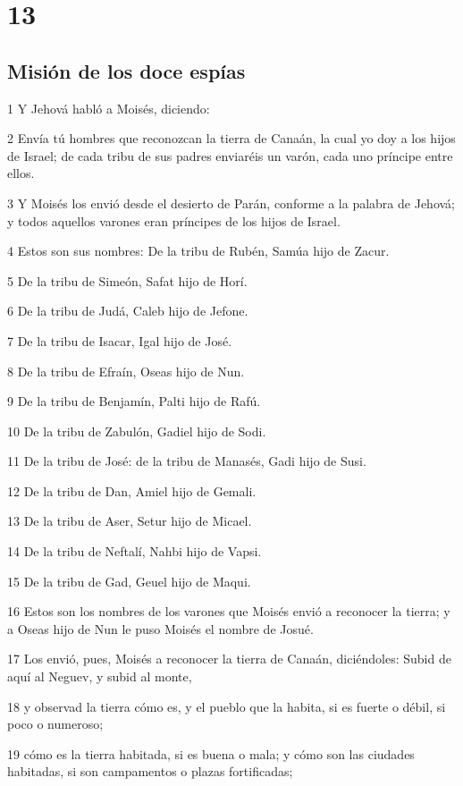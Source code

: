 \chapter{13}

\section*{Misión de los doce espías }

\par 1 Y Jehová habló a Moisés, diciendo:
\par 2 Envía tú hombres que reconozcan la tierra de Canaán, la cual yo doy a los hijos de Israel; de cada tribu de sus padres enviaréis un varón, cada uno príncipe entre ellos.
\par 3 Y Moisés los envió desde el desierto de Parán, conforme a la palabra de Jehová; y todos aquellos varones eran príncipes de los hijos de Israel.
\par 4 Estos son sus nombres: De la tribu de Rubén, Samúa hijo de Zacur.
\par 5 De la tribu de Simeón, Safat hijo de Horí.
\par 6 De la tribu de Judá, Caleb hijo de Jefone.
\par 7 De la tribu de Isacar, Igal hijo de José.
\par 8 De la tribu de Efraín, Oseas hijo de Nun.
\par 9 De la tribu de Benjamín, Palti hijo de Rafú.
\par 10 De la tribu de Zabulón, Gadiel hijo de Sodi.
\par 11 De la tribu de José: de la tribu de Manasés, Gadi hijo de Susi.
\par 12 De la tribu de Dan, Amiel hijo de Gemali.
\par 13 De la tribu de Aser, Setur hijo de Micael.
\par 14 De la tribu de Neftalí, Nahbi hijo de Vapsi. 
\par 15 De la tribu de Gad, Geuel hijo de Maqui.
\par 16 Estos son los nombres de los varones que Moisés envió a reconocer la tierra; y a Oseas hijo de Nun le puso Moisés el nombre de Josué.
\par 17 Los envió, pues, Moisés a reconocer la tierra de Canaán, diciéndoles: Subid de aquí al Neguev, y subid al monte,
\par 18 y observad la tierra cómo es, y el pueblo que la habita, si es fuerte o débil, si poco o numeroso;
\par 19 cómo es la tierra habitada, si es buena o mala; y cómo son las ciudades habitadas, si son campamentos o plazas fortificadas;
